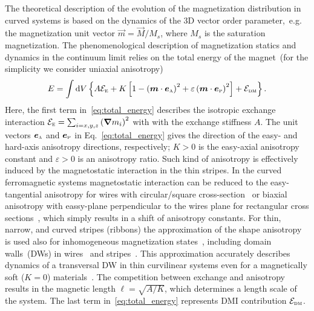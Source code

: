 \documentclass[runningheads]{llncs}
\begin{document}
The theoretical description of the evolution of the magnetization distribution in curved systems is based on the dynamics of the 3D vector order parameter,~e.g. the magnetization unit vector $\vec{m}=\vec{M}/M_s$, where $M_s$ is the saturation magnetization. The phenomenological description of magnetization statics and dynamics in the continuum limit relies on the total energy of the magnet~(for the simplicity we consider uniaxial anisotropy) 
\begin{equation}\label{eq:total_energy}
	E=\int\mathrm{d}V\left\{A\mathcal{E}_\textsc{e}+K\left[1-\left(\vec{m}\cdot\vec{e}_\textsc{a}\right)^2+\varepsilon\left(\vec{m}\cdot\vec{e}_\textsc{p}\right)^2\right]+\mathcal{E}_\textsc{dm}\right\}.
\end{equation}
Here, the first term in~\eqref{eq:total_energy} describes the isotropic exchange interaction $\mathcal{E}_\textsc{e}=\sum_{i=x,y,z}\left(\vec{\nabla} m_i\right)^2$ with with the exchange stiffness $A$. The unit vectors $\vec{e}_\textsc{a}$ and $\vec{e}_\textsc{p}$ in Eq.~\eqref{eq:total_energy} gives the direction of the easy- and hard-axis anisotropy directions, respectively; $K>0$ is the easy-axial anisotropy constant and $\varepsilon>0$ is an anisotropy ratio. Such kind of anisotropy is effectively induced by the magnetostatic interaction in the thin stripes. In the curved ferromagnetic systems magnetostatic interaction can be reduced to the easy-tangential anisotropy for wires with circular/square cross-section~\cite{Slastikov12} or biaxial anisotropy with eassy-plane perpendicular to the wires plane for rectangular cross sections~\cite{Aharoni98,Gaididei17a}, which simply results in a shift of anisotropy constants. For thin, narrow, and curved stripes (ribbons) the approximation of the shape anisotropy is used also for inhomogeneous magnetization states~\cite{Gaididei17a}, including domain walls~(DWs) in wires~\cite{Yershov15b,Yershov16,Pylypovskyi16} and stripes~\cite{Yershov18a,Volkov19c}. This approximation accurately describes dynamics of a transversal DW in thin curvilinear systems even for a magnetically soft ($K = 0$) materials~\cite{Yershov15b,Yershov16,Pylypovskyi16,Yershov18a,Volkov19c}.  The competition between exchange and anisotropy results in the magnetic length $\ell=\sqrt{A/K}$, which determines a length scale of the system.  The last term in~\eqref{eq:total_energy} represents DMI contribution  $\mathcal{E}_\textsc{dm}$.
\end{document}

